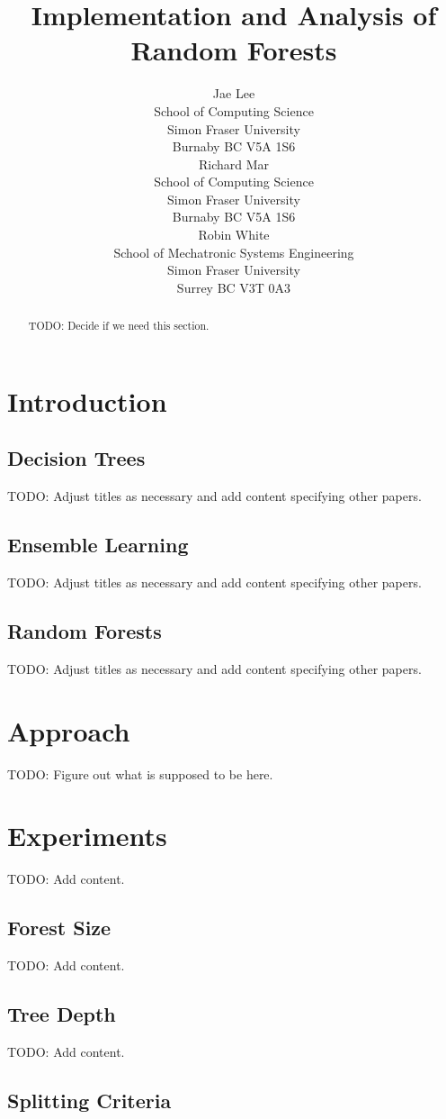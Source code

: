 \documentclass{article} %
\title{Implementation and Analysis of Random Forests}
\author{
Jae Lee\\
School of Computing Science\\
Simon Fraser University\\
Burnaby BC V5A 1S6 \\
\And
Richard Mar \\
School of Computing Science\\
Simon Fraser University\\
Burnaby BC V5A 1S6 \\
\AND
Robin White \\
School of Mechatronic Systems Engineering\\
Simon Fraser University\\
Surrey BC V3T 0A3 \\
}
\begin{document}
\maketitle

\begin{abstract}
TODO: Decide if we need this section.
\end{abstract}

\section{Introduction}

\subsection{Decision Trees}
TODO: Adjust titles as necessary and add content specifying other papers.

\subsection{Ensemble Learning}
TODO: Adjust titles as necessary and add content specifying other papers.

\subsection{Random Forests}
TODO: Adjust titles as necessary and add content specifying other papers.

\section{Approach}
TODO: Figure out what is supposed to be here.

\section{Experiments}
TODO: Add content.

\subsection{Forest Size}
TODO: Add content.

\subsection{Tree Depth}
TODO: Add content.

\subsection{Splitting Criteria}
\end{document}
